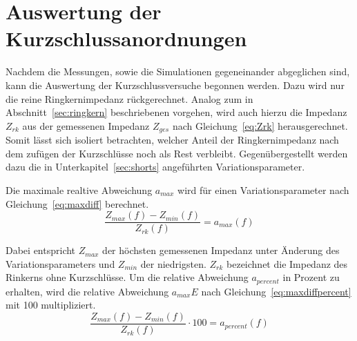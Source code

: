 \section{Auswertung der Kurzschlussanordnungen}
Nachdem die Messungen, sowie die Simulationen gegeneinander abgeglichen sind, kann die Auswertung der Kurzschlussversuche begonnen werden. Dazu wird nur die reine Ringkernimpedanz r\"uckgerechnet. Analog zum in Abschnitt~\ref{sec:ringkern} beschriebenen vorgehen, wird auch hierzu die Impedanz $Z_{rk}$ aus der gemessenen Impedanz $Z_{ges}$ nach Gleichung~\ref{eq:Zrk} herausgerechnet. Somit l\"asst sich isoliert betrachten, welcher Anteil der Ringkernimpedanz nach dem zuf\"ugen der Kurzschl\"usse noch als Rest verbleibt. Gegen\"ubergestellt werden dazu die in Unterkapitel~\ref{sec:shorts} angef\"uhrten Variationsparameter.
\par
Die maximale realtive Abweichung $a_{max}$ wird f\"ur einen Variationsparameter  nach Gleichung~\ref{eq:maxdiff} berechnet.
\begin{equation}
	\frac{Z_{max}(f) - Z_{min}(f)}{Z_{rk}(f)} = a_{max}(f)
	\label{eq:maxdiff}
\end{equation}
\par
Dabei entspricht $Z_{max}$ der h\"ochsten gemessenen Impedanz unter \"Anderung des Variationsparameters und $Z_{min}$ der niedrigsten. $Z_{rk}$ bezeichnet die Impedanz des Rinkerns ohne Kurzschl\"usse. Um die relative Abweichung $a_{percent}$ in Prozent zu erhalten, wird die relative Abweichung $a_{max}E$ nach Gleichung~\ref{eq:maxdiffpercent} mit 100 multipliziert.
\begin{equation}
	\frac{Z_{max}(f) - Z_{min}(f)}{Z_{rk}(f)}\cdot 100 = a_{percent}(f)
	\label{eq:maxdiffpercent}
\end{equation}


